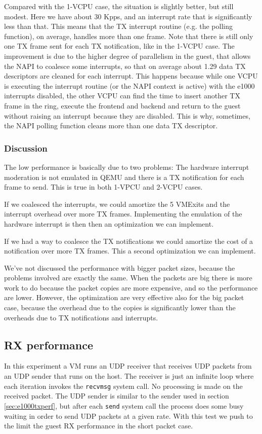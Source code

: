 Compared with the 1-VCPU case, the situation is slightly better, but still modest. Here we have about 30 Kpps, and an interrupt rate
that is significantly less than that. This means that the TX interrupt routine (e.g. the polling function), on average, handles more than
one frame.
Note that there is still only one TX frame sent for each TX notification, like in the 1-VCPU case.
The improvement is due to the higher degree of parallelism in the guest, that allows the NAPI to coalesce some interrupts, so that
on average about 1.29 data TX descriptors are cleaned for each interrupt. This happens because while one VCPU is executing the interrupt
routine (or the NAPI context is active) with the e1000 interrupts disabled, the other VCPU can find the time to insert another TX frame
in the ring, execute the frontend and backend and return to the guest without raising an interrupt because they are disabled.
This is why, sometimes, the NAPI polling function cleans more than one data TX descriptor.


\subsubsection{Discussion}
\label{sec:e1000txperfdiscuss}
The low performance is basically due to two problems: The hardware interrupt moderation is not emulated in QEMU and there is a TX 
notification for each frame to send. This is true in both 1-VPCU and 2-VCPU cases.

If we coalesced the interrupts, we could amortize the 5 VMExits and the interrupt overhead over more TX frames.
Implementing the emulation of the hardware interrupt is then then an optimization we can implement.

If we had a way to coalesce the TX notifications we could amortize the cost of a notification over more TX frames. This
a second optimization we can implement.

\vspace{0.5cm}

We've not discussed the performance with bigger packet sizes, because the problems involved are exactly the same. When the packets are 
big there is more work to do because the packet copies are more expensive, and so the performance are lower. However,
the optimization are very effective also for the big packet case, because the overhead due to the copies is significantly lower than
the overheads due to TX notifications and interrupts.



\subsection{RX performance}
In this experiment a VM runs an UDP receiver that receives UDP packets from an UDP sender that runs on the host. The receiver is just an 
infinite loop where each iteration invokes the \texttt{recvmsg} system call. No processing is made on the received packet.
The UDP sender is similar to the sender used in section \ref{sec:e1000txperf}, but after each \texttt{send} system call the process
does some busy waiting in order to send UDP packets at a given rate.
With this test we push to the limit the guest RX performance in the short packet case.

